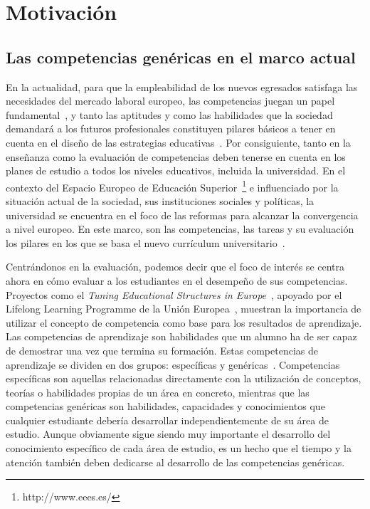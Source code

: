 


\section{Motivación}
\label{sec:Motivation}

\subsection*{Las competencias genéricas en el marco actual}

En la actualidad, para que la empleabilidad de los nuevos egresados satisfaga las necesidades del mercado laboral europeo, las competencias juegan un papel fundamental~\cite{communique2012making}, y tanto las aptitudes y como las habilidades que la sociedad demandará a los futuros profesionales constituyen pilares básicos a tener en cuenta en el diseño de las estrategias educativas~\cite{de2010project}. Por consiguiente, tanto en la enseñanza como la evaluación de competencias deben tenerse en cuenta en los planes de estudio a todos los niveles educativos, incluida la universidad. En el contexto del Espacio Europeo de Educación Superior~\footnote{http://www.eees.es/} e influenciado por la situación actual de  la sociedad, sus instituciones sociales y políticas, la universidad se encuentra en el foco de las reformas para alcanzar la convergencia a nivel europeo. En este marco, son las competencias, las tareas y su evaluación los pilares en los que se basa el nuevo currículum universitario~\cite{zabala2005espacio}.  

Centrándonos en la evaluación, podemos decir que el foco de interés se centra ahora en cómo evaluar a los estudiantes en el desempeño de sus competencias. Proyectos como el \emph{Tuning Educational Structures in Europe}~\cite{gonzalez2005tuning}, apoyado por el Lifelong Learning Programme de la Unión Europea~\cite{llp:2006}, muestran la importancia de utilizar el concepto de competencia como base para los resultados de aprendizaje. Las competencias de aprendizaje son habilidades que un alumno ha de ser capaz de demostrar una vez que termina su formación. Estas competencias de aprendizaje se dividen en dos grupos: específicas y genéricas~\cite{strijbos2015criteria}. Competencias específicas son aquellas relacionadas directamente con la utilización de conceptos, teorías o habilidades propias de un área en concreto, mientras que las competencias genéricas son habilidades, capacidades y conocimientos que cualquier estudiante debería desarrollar independientemente de su área de estudio. Aunque obviamente sigue siendo muy importante el desarrollo del conocimiento específico de cada área de estudio, es un hecho que el tiempo y la atención también deben dedicarse al desarrollo de las competencias genéricas. %

